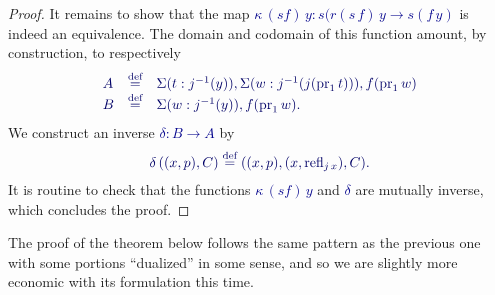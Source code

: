 \documentclass[10pt]{article}
\newcommand{\db}{\textcolor{darkblue}}
\newcommand{\m}[1]{\db{$#1$}}
\newcommand{\M}[1]{\[\db{#1}\]}
\newcommand{\fst}{\operatorname{pr}_1}
\newcommand{\refl}{\operatorname{refl}}
\newcommand{\eqdef}{\overset{\text{def}}{=}}
\theoremstyle{definition}
\begin{document}
\begin{proof}
  It remains to show that the map \m{\kappa \, (s f) \, y : s(r(s \,
    f) \, y \to s (f \, y)} is indeed an equivalence. The domain and
  codomain of this function amount, by construction, to respectively
  \M{
    \begin{array}{lll}
      A & \eqdef & \Sigma (t : j^{-1}(y)), \Sigma (w : j^{-1}(j (\fst t))), f (\fst w)\\
      B & \eqdef & \Sigma (w : j^{-1}(y)), f(\fst w).
    \end{array}
  }
  We construct an inverse \m{\delta : B \to A} by
  \M{
    \delta \, ((x , p),C) \eqdef ((x , p) , (x , \refl_{j \, x}) , C).
  }
  It is routine to check that the functions \m{\kappa \, (s f) \, y}
  and \m{\delta} are mutually inverse, which concludes the proof.
\end{proof}

The proof of the theorem below follows the same pattern as the
previous one with some portions ``dualized'' in some sense, and so we
are slightly more economic with its formulation this time.
\end{document}
